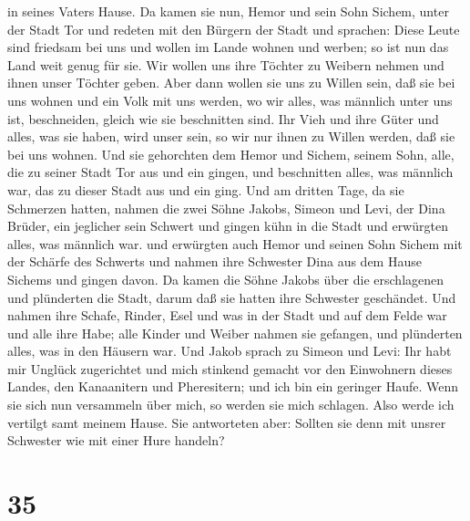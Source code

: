 in seines Vaters Hause.  Da kamen sie nun, Hemor und sein
Sohn Sichem, unter der Stadt Tor und redeten mit den Bürgern der Stadt
und sprachen:  Diese Leute sind friedsam bei uns und wollen
im Lande wohnen und werben; so ist nun das Land weit genug für sie. Wir
wollen uns ihre Töchter zu Weibern nehmen und ihnen unser Töchter geben.
 Aber dann wollen sie uns zu Willen sein, daß sie bei uns
wohnen und ein Volk mit uns werden, wo wir alles, was männlich unter uns
ist, beschneiden, gleich wie sie beschnitten sind.  Ihr
Vieh und ihre Güter und alles, was sie haben, wird unser sein, so wir
nur ihnen zu Willen werden, daß sie bei uns wohnen.  Und
sie gehorchten dem Hemor und Sichem, seinem Sohn, alle, die zu seiner
Stadt Tor aus und ein gingen, und beschnitten alles, was männlich war,
das zu dieser Stadt aus und ein ging.  Und am dritten Tage,
da sie Schmerzen hatten, nahmen die zwei Söhne Jakobs, Simeon und Levi,
der Dina Brüder, ein jeglicher sein Schwert und gingen kühn in die Stadt
und erwürgten alles, was männlich war.  und erwürgten auch
Hemor und seinen Sohn Sichem mit der Schärfe des Schwerts und nahmen
ihre Schwester Dina aus dem Hause Sichems und gingen davon.
 Da kamen die Söhne Jakobs über die erschlagenen und
plünderten die Stadt, darum daß sie hatten ihre Schwester geschändet.
 Und nahmen ihre Schafe, Rinder, Esel und was in der Stadt
und auf dem Felde war  und alle ihre Habe; alle Kinder und
Weiber nahmen sie gefangen, und plünderten alles, was in den Häusern
war.  Und Jakob sprach zu Simeon und Levi: Ihr habt mir
Unglück zugerichtet und mich stinkend gemacht vor den Einwohnern dieses
Landes, den Kanaanitern und Pheresitern; und ich bin ein geringer Haufe.
Wenn sie sich nun versammeln über mich, so werden sie mich schlagen.
Also werde ich vertilgt samt meinem Hause.  Sie antworteten
aber: Sollten sie denn mit unsrer Schwester wie mit einer Hure handeln?

\hypertarget{section-34}{%
\section{35}\label{section-34}}

